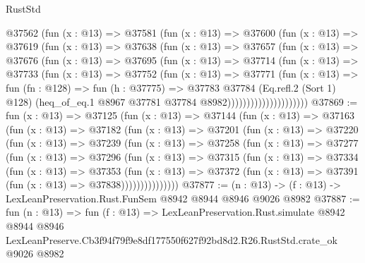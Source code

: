 \begin{lexlean}{RustStd}
\begin{coremodule}
                  @37562
                    (fun (x : @13) =>
                    @37581
                      (fun (x : @13) =>
                      @37600
                        (fun (x : @13) =>
                        @37619
                          (fun (x : @13) =>
                          @37638
                            (fun (x : @13) =>
                            @37657
                              (fun (x : @13) =>
                              @37676
                                (fun (x : @13) =>
                                @37695
                                  (fun (x : @13) =>
                                  @37714
                                    (fun (x : @13) =>
                                    @37733
                                      (fun (x : @13) =>
                                      @37752
                                        (fun (x : @13) =>
                                        @37771
                                          (fun (x : @13) =>
                                          fun (fn : @128) =>
                                          fun (h : @37775) =>
                                          @37783
                                            @37784
                                            (Eq.refl.{2} (Sort 1) @128)
                                            (heq_of_eq.{1}
                                              @8967
                                              @37781
                                              @37784
                                              @8982)))))))))))))))))))))
@37869 := fun (x : @13) =>
  @37125
    (fun (x : @13) =>
    @37144
      (fun (x : @13) =>
      @37163
        (fun (x : @13) =>
        @37182
          (fun (x : @13) =>
          @37201
            (fun (x : @13) =>
            @37220
              (fun (x : @13) =>
              @37239
                (fun (x : @13) =>
                @37258
                  (fun (x : @13) =>
                  @37277
                    (fun (x : @13) =>
                    @37296
                      (fun (x : @13) =>
                      @37315
                        (fun (x : @13) =>
                        @37334
                          (fun (x : @13) =>
                          @37353
                            (fun (x : @13) =>
                            @37372 (fun (x : @13) => @37391 (fun (x : @13) => @37838)))))))))))))))
@37877 := (n : @13) -> (f : @13) -> LexLeanPreservation.Rust.FunSem @8942 @8944 @8946 @9026 @8982
@37887 := fun (n : @13) =>
  fun (f : @13) =>
  LexLeanPreservation.Rust.simulate
    @8942
    @8944
    @8946
    LexLeanPreserve.Cb3f94f79f9e8df177550f627f92bd8d2.R26.RustStd.crate_ok
    @9026
    @8982
\end{coremodule}
\end{lexlean}
